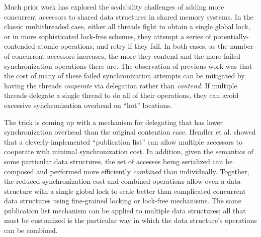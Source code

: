 Much prior work has explored the scalability challenges of adding more concurrent accessors to shared data structures in shared memory systems.
In the classic multithreaded case, either all threads fight to obtain a single global lock, or in more sophisticated lock-free schemes, they attempt a series of potentially-contended atomic operations, and retry if they fail. In both cases, as the number of concurrent accessors increases, the more they contend and the more failed synchronization operations there are.
The observation of previous work was that the cost of many of these failed synchronization attempts can be mitigated by having the threads \emph{cooperate} via delegation rather than \emph{contend}.
If multiple threads delegate a single thread to do all of their operations, they can avoid excessive synchronization overhead on ``hot'' locations.

The trick is coming up with a mechanism for delegating that has lower synchronization overhead than the original contention case.
Hendler et al.\cite{flatCombining} showed that a cleverly-implemented ``publication list'' can allow multiple accessors to cooperate with minimal synchronization cost.
In addition, given the semantics of some particular data structures, the set of accesses being serialized can be composed and performed more efficiently \emph{combined} than individually.
Together, the reduced synchronization cost and combined operations allow even a data structure with a single global lock to scale better than complicated concurrent data structures using fine-grained locking or lock-free mechanisms.
The same publication list mechanism can be applied to multiple data structures; all that must be customized is the particular way in which the data structure's operations can be combined.


